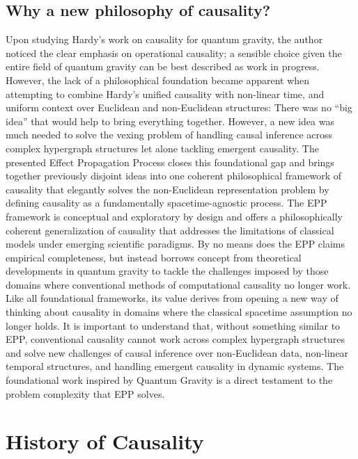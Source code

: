 \documentclass{article}
\begin{document}
\subsection{Why a new philosophy of causality?}

Upon studying Hardy’s work on causality for quantum gravity\cite{HardyDynamicCausalStructure}, the author noticed the clear emphasis on operational causality; a sensible choice given the entire field of quantum gravity can be best described as work in progress.
However, the lack of a philosophical foundation became apparent when attempting to combine Hardy’s unified causality with non-linear time, and uniform context over Euclidean and non-Euclidean structures: There was no “big idea” that would help to bring everything together. However, a new idea was much needed to solve the vexing problem of handling causal inference across complex hypergraph structures let alone tackling emergent causality. The presented Effect Propagation Process closes this foundational gap and brings together previously disjoint ideas into one coherent philosophical framework of causality that elegantly solves the non-Euclidean representation problem by defining causality as a fundamentally spacetime-agnostic process.\newline
The EPP framework is conceptual and exploratory by design and offers a philosophically coherent generalization of causality that addresses the limitations of classical models under emerging scientific paradigms. By no means does the EPP claims empirical completeness, but instead borrows concept from theoretical developments in quantum gravity to tackle the challenges imposed by those domains where conventional methods of computational causality no longer work. Like all foundational frameworks, its value derives from opening a new way of thinking about causality in domains where the classical spacetime assumption no longer holds.\newline
It is important to understand that, without something similar to EPP, conventional causality cannot work across complex hypergraph structures and solve new challenges of causal inference over non-Euclidean data, non-linear temporal structures, and handling emergent causality in dynamic systems. The foundational work inspired by Quantum Gravity is a direct testament to the problem complexity that EPP solves.
 
\newpage

\section{History of Causality}
\label{sec:history}
\end{document}
